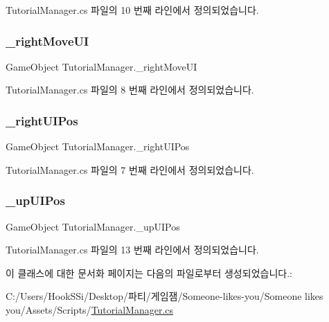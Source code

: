 Tutorial\+Manager.\+cs 파일의 10 번째 라인에서 정의되었습니다.

\mbox{\label{class_tutorial_manager_a5c25f48e6be1940caa239b2fb0f311f6}} 
\subsubsection{\texorpdfstring{\_rightMoveUI}{\_rightMoveUI}}
{\footnotesize\ttfamily Game\+Object Tutorial\+Manager.\+\_\+right\+Move\+UI}



Tutorial\+Manager.\+cs 파일의 8 번째 라인에서 정의되었습니다.

\mbox{\label{class_tutorial_manager_a838caaf12f20fdcfce77cd55b9771073}} 
\subsubsection{\texorpdfstring{\_rightUIPos}{\_rightUIPos}}
{\footnotesize\ttfamily Game\+Object Tutorial\+Manager.\+\_\+right\+U\+I\+Pos}



Tutorial\+Manager.\+cs 파일의 7 번째 라인에서 정의되었습니다.

\mbox{\label{class_tutorial_manager_a5c9726a561fe99901f13a34684b14984}} 
\subsubsection{\texorpdfstring{\_upUIPos}{\_upUIPos}}
{\footnotesize\ttfamily Game\+Object Tutorial\+Manager.\+\_\+up\+U\+I\+Pos}



Tutorial\+Manager.\+cs 파일의 13 번째 라인에서 정의되었습니다.



이 클래스에 대한 문서화 페이지는 다음의 파일로부터 생성되었습니다.\+:\begin{DoxyCompactItemize}
\item 
C\+:/\+Users/\+Hook\+S\+Si/\+Desktop/파티/게임잼/\+Someone-\/likes-\/you/\+Someone likes you/\+Assets/\+Scripts/\mbox{\hyperlink{_tutorial_manager_8cs}{Tutorial\+Manager.\+cs}}\end{DoxyCompactItemize}
